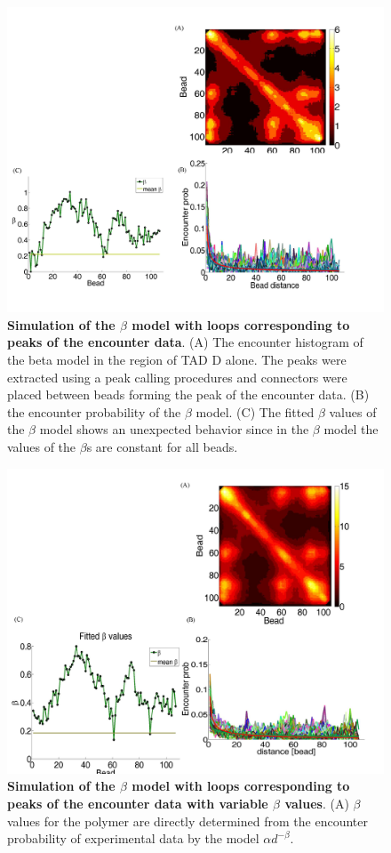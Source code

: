 \documentclass[12pt]{article}
\begin{document}
\begin{figure}[H]
\includegraphics[scale=0.7]{Figure06_betaModelWithPeaks}
\caption{\textbf{Simulation of the $\beta$ model with loops corresponding to peaks of the encounter data}. (A) The encounter histogram of the beta model in the region of TAD D alone. The peaks were extracted using a peak calling procedures and connectors were placed between beads forming the peak of the encounter data. (B) the encounter probability of the $\beta$ model. (C) The fitted $\beta$ values of the $\beta$ model shows an unexpected behavior since in the $\beta$ model the values of the $\beta$s are constant for all beads.}
\label{simulationWithBetaPolymerWithLoops}
\end{figure}


\begin{figure}[H]
\includegraphics[scale=0.7]{Figure07_betaModelWithPeaksVariableBeta}
\caption{\textbf{Simulation of the $\beta$ model with loops corresponding to peaks of the encounter data with variable $\beta$ values}. (A) $\beta$ values for the polymer are directly determined from the encounter probability of experimental data by the model $\alpha d^{-\beta}$.}
\label{simulationWithBetaPolymerWithLoopsVariableBeta}
\end{figure}



\end{document}
